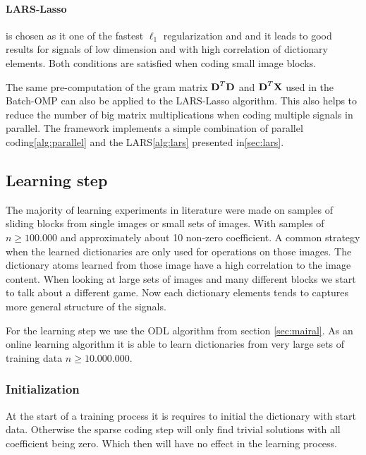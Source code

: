 
\paragraph{LARS-Lasso} is chosen as it one of the fastest $\ell_1$
regularization and and it leads to good results for signals of low dimension and
with high correlation of dictionary elements.\cite{Mairal2010} Both conditions
are satisfied when coding small image blocks.

The same pre-computation of the gram matrix $\boldsymbol{\mathrm{D}}^T\boldsymbol{\mathrm{D}}$ and
$\boldsymbol{\mathrm{D}}^T\boldsymbol{\mathrm{X}}$ used in the Batch-OMP can also be applied to the LARS-Lasso
algorithm. This also helps to reduce the number of big matrix multiplications
when coding multiple signals in parallel. The framework implements a simple
combination of parallel coding\ref{alg:parallel} and the LARS\ref{alg:lars}
presented in\ref{sec:lars}.

\subsection{Learning step}
The majority of learning experiments in literature were made on
samples of sliding blocks from single images or small sets of images.
With samples of $n \ge 100.000$ and approximately about 10 non-zero coefficient.
A common strategy when the learned dictionaries are only used for operations on
those images. The dictionary atoms learned from those image have a high
correlation to the image content.  When looking at large sets of images and many
different blocks we start to talk about a different game. Now each dictionary
elements tends to captures more general structure of the signals.

For the learning step we use the ODL algorithm from section \ref{sec:mairal}. As
an online learning algorithm it is able to learn dictionaries from very large
sets of training data $n\ge 10.000.000$.


\subsubsection{Initialization}
At the start of a training process it is requires to initial the
dictionary with start data. Otherwise the sparse coding step will only find
trivial solutions with all coefficient being zero. Which then will have no
effect in the learning process.

